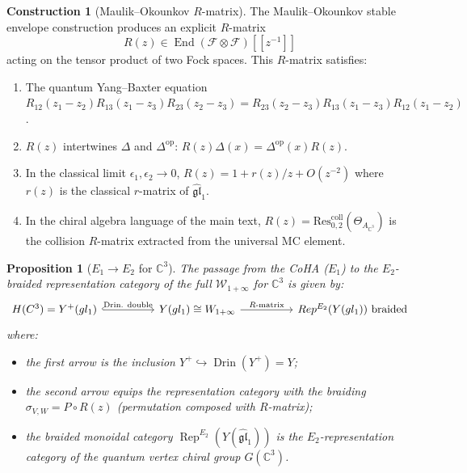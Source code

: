 \documentclass[11pt]{article}
\newtheorem{proposition}[theorem]{Proposition}
\theoremstyle{definition}
\newtheorem{construction}[theorem]{Construction}
\theoremstyle{remark}
\newcommand{\CC}{\mathbb{C}}
\newcommand{\Rep}{\operatorname{Rep}}
\newcommand{\End}{\operatorname{End}}
\newcommand{\CoHA}{\mathcal{H}}
\newcommand{\cF}{\mathcal{F}}
\newcommand{\cW}{\mathcal{W}}
\newcommand{\op}{\operatorname{op}}
\newcommand{\gl}{\mathfrak{gl}}
\begin{document}
\begin{construction}[Maulik--Okounkov $R$-matrix]
\label{constr:mo-r-matrix}
The Maulik--Okounkov stable envelope construction produces an explicit
$R$-matrix
\[
 R(z) \in \End(\cF \otimes \cF)[\![z^{-1}]\!]
\]
acting on the tensor product of two Fock spaces. This $R$-matrix satisfies:
\begin{enumerate}[label=(\roman*)]
 \item The quantum Yang--Baxter equation
 $R_{12}(z_1-z_2) R_{13}(z_1-z_3) R_{23}(z_2-z_3) =
 R_{23}(z_2-z_3) R_{13}(z_1-z_3) R_{12}(z_1-z_2)$.
 \item $R(z)$ intertwines $\Delta$ and $\Delta^{\op}$:
 $R(z) \Delta(x) = \Delta^{\op}(x) R(z)$.
 \item In the classical limit $\epsilon_1, \epsilon_2 \to 0$,
 $R(z) = 1 + r(z)/z + O(z^{-2})$ where $r(z)$ is the classical $r$-matrix
 of $\widehat{\gl}_1$.
 \item In the chiral algebra language of the main text,
 $R(z) = \mathrm{Res}^{\mathrm{coll}}_{0,2}(\Theta_{A_{\CC^3}})$
 is the collision $R$-matrix extracted from the universal MC element.
\end{enumerate}
\end{construction}

\begin{proposition}[$E_1 \to E_2$ for $\CC^3$]
\label{prop:e1-to-e2-c3}
The passage from the CoHA ($E_1$) to the $E_2$-braided representation
category of the full $\cW_{1+\infty}$ for $\CC^3$ is given by:
\[
\begin{tikzcd}[column sep=huge]
 \CoHA(\CC^3) = Y^+(\widehat{\gl}_1)
 \arrow[r, hook, "\text{Drin. double}"]
 & Y(\widehat{\gl}_1) \cong \cW_{1+\infty}
 \arrow[r, "\text{$R$-matrix}"]
 & \Rep^{E_2}(Y(\widehat{\gl}_1)) \text{ braided}
\end{tikzcd}
\]
where:
\begin{itemize}
 \item the first arrow is the inclusion $Y^+ \hookrightarrow
 \operatorname{Drin}(Y^+) = Y$;
 \item the second arrow equips the representation category with the
 braiding $\sigma_{V,W} = P \circ R(z)$ (permutation composed with
 $R$-matrix);
 \item the braided monoidal category $\Rep^{E_2}(Y(\widehat{\gl}_1))$
 is the $E_2$-representation category of the quantum vertex chiral group
 $G(\CC^3)$.
\end{itemize}
\end{proposition}
\end{document}
